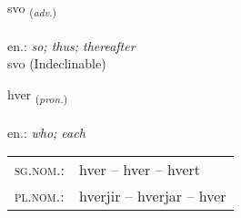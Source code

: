 \documentclass[frontgrid, backgrid]{flacards}\usepackage[]{graphicx}\usepackage[]{xcolor}
\begin{document}
\renewcommand{\blhead}{\vskip5pt {\small\bfseries\footnotesize Atviksorð | Adverb }}
\renewcommand{\bcfoot}{\vskip5pt \hspace{2pt}{\small\bfseries\footnotesize 1K}}


{svo \small{\textsubscript{(\textit{adv.})}} \\[1ex]
\textphonetic{[svɔː]} \\
en.: \emph{so; thus; thereafter} \\  [2ex]
svo (Indeclinable)}

\renewcommand{\flhead}{\vskip5pt \fboxsep=0pt {\small\bfseries\footnotesize Fornafn | Pronoun}}
\renewcommand{\fcfoot}{\vskip5pt \fboxsep=0pt \hspace{2pt}{\small\bfseries\footnotesize 1K}}

\renewcommand{\blhead}{\vskip5pt {\small\bfseries\footnotesize Fornafn | Pronoun }}
\renewcommand{\bcfoot}{\vskip5pt \hspace{2pt}{\small\bfseries\footnotesize 1K}}


{hver \small{\textsubscript{(\textit{pron.})}} \\[1ex] %
\textphonetic{[kʰvɛr]} \\
en.: \emph{who; each} \\  [2ex]
\renewcommand*{\arraystretch}{0.8}
\begin{tabular}{ll}
\textsc{sg.nom.}: & hver  --  hver -- hvert \\ 
\textsc{pl.nom.}: & hverjir -- hverjar -- hver
\end{tabular}
}

\renewcommand{\flhead}{\vskip5pt \fboxsep=0pt {\small\bfseries\footnotesize Sagnorð | Verb}}
\renewcommand{\fcfoot}{\vskip5pt \fboxsep=0pt \hspace{2pt}{\small\bfseries\footnotesize 1K}}

\renewcommand{\blhead}{\vskip5pt {\small\bfseries\footnotesize Sagnorð | Verb }}
\renewcommand{\bcfoot}{\vskip5pt \hspace{2pt}{\small\bfseries\footnotesize 1K}}
\end{document}
